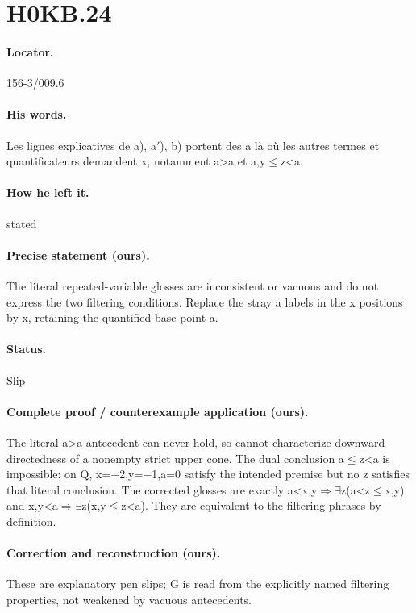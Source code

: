 \section*{H0KB.24}\label{statement:H0KB.24}
\paragraph{Locator.} 156-3/009.6

\paragraph{His words.} Les lignes explicatives de a), a\ensuremath{\prime}), b) portent des a là où les autres termes et quantificateurs demandent x, notamment a>a et a,y\ensuremath{\leq}z<a.

\paragraph{How he left it.} stated

\paragraph{Precise statement (ours).} The literal repeated-variable glosses are inconsistent or vacuous and do not express the two filtering conditions. Replace the stray a labels in the x positions by x, retaining the quantified base point a.

\paragraph{Status.} Slip

\paragraph{Complete proof / counterexample application (ours).} The literal a>a antecedent can never hold, so cannot characterize downward directedness of a nonempty strict upper cone. The dual conclusion a\ensuremath{\leq}z<a is impossible: on Q, x=\ensuremath{-}2,y=\ensuremath{-}1,a=0 satisfy the intended premise but no z satisfies that literal conclusion. The corrected glosses are exactly a<x,y\ensuremath{\Rightarrow}\ensuremath{\exists}z(a<z\ensuremath{\leq}x,y) and x,y<a\ensuremath{\Rightarrow}\ensuremath{\exists}z(x,y\ensuremath{\leq}z<a). They are equivalent to the filtering phrases by definition.

\paragraph{Correction and reconstruction (ours).} These are explanatory pen slips; G is read from the explicitly named filtering properties, not weakened by vacuous antecedents.

